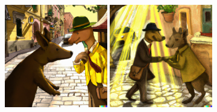 \documentclass{article}
\newcommand{\imagewidthfactor}{0.4}
\begin{document}
\begin{figure}[h!]
\vspace{1.1em}
\includegraphics[width=\imagewidthfactor\textwidth]{media/3c.png}
\quad
\includegraphics[width=\imagewidthfactor\textwidth]{media/3d.png}
\end{figure}
\end{document}
